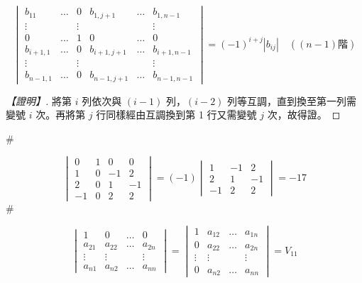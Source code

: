 \begin{corollary}\label{cor:b6-1-3}
\begin{equation}
\begin{vmatrix}
b_{11} & \dots & 0 & b_{1,j+1} & \dots & b_{1,n-1} \\
\vdots & & \vdots & & & \vdots \\
0 & \dots & 1 & 0 & \dots & 0 \\
b_{i+1,1} & \dots & 0 & b_{i+1,j+1} & \dots & b_{i+1,n-1} \\
\vdots & & \vdots & & & \vdots \\
b_{n-1,1} & \dots & 0 & b_{n-1,j+1} & \dots & b_{n-1,n-1}
\end{vmatrix} = (-1)^{i+j} |b_{ij}| \quad ((n-1)\text{階}) \label{eq:b6-1-6-12}
\end{equation}
\end{corollary}

\begin{proof}[【證明】]
將第 $i$ 列依次與 $(i-1)$ 列，$(i-2)$ 列等互調，直到換至第一列需變號 $i$ 次。再將第 $j$ 行同樣經由互調換到第 1 行又需變號 $j$ 次，故得證。
\end{proof}\hfill$\#$

\begin{example}\label{ex:b6-1-27}
\[ \begin{vmatrix}
0 & 1 & 0 & 0 \\
1 & 0 & -1 & 2 \\
2 & 0 & 1 & -1 \\
-1 & 0 & 2 & 2
\end{vmatrix} = (-1) \begin{vmatrix}
1 & -1 & 2 \\
2 & 1 & -1 \\
-1 & 2 & 2
\end{vmatrix} = -17 \]\hfill$\#$
\end{example}

\begin{lemma}\label{lem:b6-1-2}
\begin{equation}
\begin{vmatrix}
1 & 0 & \dots & 0 \\
a_{21} & a_{22} & \dots & a_{2n} \\
\vdots & \vdots & & \vdots \\
a_{n1} & a_{n2} & \dots & a_{nn}
\end{vmatrix} = \begin{vmatrix}
1 & a_{12} & \dots & a_{1n} \\
0 & a_{22} & \dots & a_{2n} \\
\vdots & \vdots & & \vdots \\
0 & a_{n2} & \dots & a_{nn}
\end{vmatrix} = V_{11} \label{eq:b6-1-6-13}
\end{equation}
\end{lemma}

